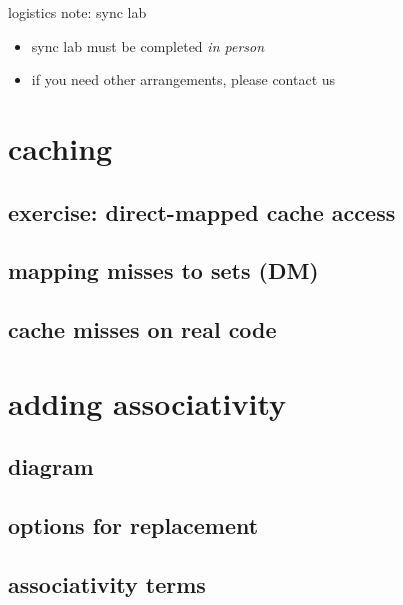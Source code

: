 \begin{frame}{logistics note: sync lab}
    \begin{itemize}
    \item sync lab must be completed \textit{in person}
    \item if you need other arrangements, please contact us
    \end{itemize}
\end{frame}

\section{caching}
\subsection{exercise: direct-mapped cache access}


\subsection{mapping misses to sets (DM)}


\subsection{cache misses on real code}


\section{adding associativity}


\subsection{diagram}


\subsection{options for replacement}




\subsection{associativity terms}


